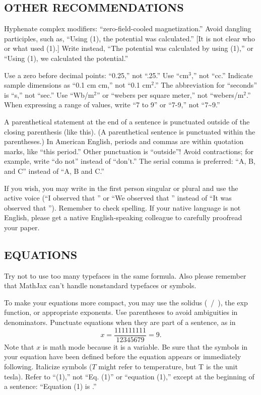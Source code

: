 \documentclass{IEEEoj}
\begin{document}
\subsection{OTHER RECOMMENDATIONS}
Hyphenate complex modifiers: 
``zero-field-cooled magnetization.'' Avoid dangling participles, such as, 
``Using (1), the potential was calculated.'' [It is not clear who or what 
used (1).] Write instead, ``The potential was calculated by using (1),'' or 
``Using (1), we calculated the potential.''

Use a zero before decimal points: ``0.25,'' not ``.25.'' Use ``cm$^3$,'' not 
``cc.'' Indicate sample dimensions as ``0.1 cm  cm,'' not 
``0.1  cm$^{2}$.'' The abbreviation for ``seconds'' is ``s,'' 
not ``sec.'' Use ``Wb/m$^{2}$'' or ``webers per square meter,'' not 
``webers/m$^2$.'' When expressing a range of values, write ``7 to 9'' or 
``7-9,'' not ``7\textasciitilde 9.''

A parenthetical statement at the end of a sentence is punctuated outside of 
the closing parenthesis (like this). (A parenthetical sentence is punctuated 
within the parentheses.) In American English, periods and commas are within 
quotation marks, like ``this period.'' Other punctuation is ``outside''! 
Avoid contractions; for example, write ``do not'' instead of ``don't.'' The 
serial comma is preferred: ``A, B, and C'' instead of ``A, B and C.''

If you wish, you may write in the first person singular or plural and use 
the active voice (``I observed that \textellipsis'' or ``We observed that \textellipsis'' 
instead of ``It was observed that \textellipsis''). Remember to check spelling. If 
your native language is not English, please get a native English-speaking 
colleague to carefully proofread your paper.

\subsection{EQUATIONS}
Try not to use too many typefaces in the same formula.
Also please remember that MathJax
can't handle nonstandard typefaces or symbols.

To make your equations more 
compact, you may use the solidus (~/~), the exp function, or appropriate 
exponents. Use parentheses to avoid ambiguities in denominators. Punctuate 
equations when they are part of a sentence, as in
\begin{equation}
\label{eq1}
x=\frac{111111111}{12345679}=9 .
\end{equation}
Note that $x$ is math mode because it is a variable. 
Be sure that the symbols in your equation have been defined before the 
equation appears or immediately following. Italicize symbols ($T$ might refer 
to temperature, but T is the unit tesla). Refer to ``(1),'' not ``Eq. (1)'' 
or ``equation (1),'' except at the beginning of a sentence: ``Equation (1) 
is \textellipsis .''
\end{document}
